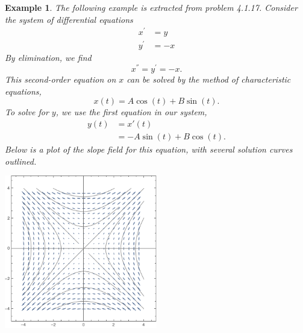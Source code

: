 \documentclass[11pt]{amsart}
\newtheorem{example}{Example}
\numberwithin{equation}{section}
\begin{document}
\begin{example}
The following example is extracted from problem 4.1.17. Consider the system of differential equations
\begin{align*}
x^{'} & = y \\
y^{'} & = -x
\end{align*}
By elimination, we find
\begin{equation*}
x^{''} = y^{'} = -x.
\end{equation*}
This second-order equation on $x$ can be solved by the method of characteristic equations, 
\begin{equation*}
x(t)=A\cos(t)+B\sin(t).
\end{equation*}
To solve for $y$, we use the first equation in our system,  
\begin{align*}
y (t) & = x'(t) \\
& = -A\sin(t)+B\cos(t).
\end{align*}
Below is a plot of the slope field for this equation, with several solution curves outlined. 
\begin{center}
\includegraphics[width=0.5\textwidth]{p4.png} 
\end{center}
\end{example}
\end{document}
